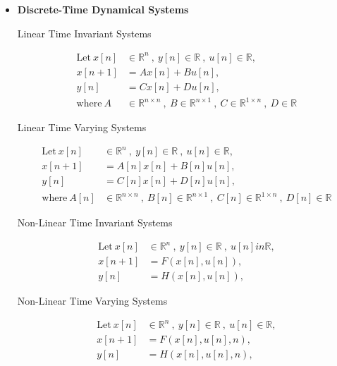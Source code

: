 \documentclass[12pt,oneside]{amsart}
\begin{document}
\begin{itemize}
\item \textbf{Discrete-Time Dynamical Systems}

Linear Time Invariant Systems

\begin{align*}
  \mathrm{Let} \ x[n] &\in \mathbb{R}^n \ , \ y[n] \in \mathbb{R} \ ,\  u[n] \in
  \mathbb{R} , \\
  x[n+1] &= A x[n] + B u[n] , \\
  y[n] &= C x[n] + D u[n] , \\
  \mathrm{where} \ A &\in \mathbb{R}^{n \times  n} \ , \ 
    B \in \mathbb{R}^{n \times 1} \ ,\  C \in \mathbb{R}^{1 \times n} \ , \ D \in \mathbb{R}
\end{align*}

\vspace{12pt}

Linear Time Varying Systems

\begin{align*}
  \mathrm{Let} \ x[n] &\in \mathbb{R}^n \ , \ y[n] \in \mathbb{R} \ ,\  u[n] \in
  \mathbb{R} , \\
  x[n+1] &= A[n] x[n] + B[n] u[n] , \\
  y[n] &= C[n] x[n] + D[n] u[n] , \\
  \mathrm{where} \ A[n] &\in \mathbb{R}^{n \times n} \ , \ 
    B[n] \in \mathbb{R}^{n \times 1} \ ,\  C[n] \in \mathbb{R}^{1
                          \times  n} \ , \ D[n] \in \mathbb{R}
\end{align*}

Non-Linear Time Invariant Systems

\begin{align*}
  \mathrm{Let} \ x[n] &\in \mathbb{R}^n \ , \ y[n] \in \mathbb{R} \ ,\
                        u[n] in \mathbb{R} , \\
  x[n+1] &= F(x[n],u[n]) , \\
  y[n] &= H(x[n],u[n]) , 
\end{align*}

Non-Linear Time Varying Systems

\begin{align*}
  \mathrm{Let} \ x[n] &\in \mathbb{R}^n \ , \ y[n] \in \mathbb{R} \ ,\  u[n] \in
  \mathbb{R} , \\
  x[n+1] &= F(x[n],u[n],n) , \\
  y[n] &= H(x[n],u[n],n) , 
\end{align*}

\end{itemize}
\end{document}
